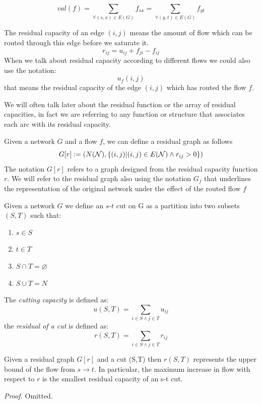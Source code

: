 \[val(f) = \sum_{\forall (s,x) \in E(G)} f_{sx} = \sum_{\forall (y,t) \in E(G)} f_{yt}\]
\begin{definition}
    The residual capacity of an edge $(i,j)$ means the amount of flow which can be routed through this edge before we saturate it.
    \[r_{ij} = u_{ij} + f_{ji} - f_{ij}\]    
    When we talk about residual capacity according to different flows we could also use the notation:    \[u_f(i,j)\]
    that means the residual capacity of the edge $(i,j)$ which has routed the flow $f$.

\end{definition}
We will often talk later about the residual function or the array of residual capacities, in fact we are referring to any function or structure that associates each arc with its residual capacity.

\begin{definition}
    Given a network $G$ and a flow $f$, we can define a residual graph as follows
    \[G[r] := (N(\mathcal{N}), \{(i,j) | (i,j)\in E(\mathcal{N}) \land r_{ij} > 0\})\]
    The notation $G[r]$ refers to a graph designed from the residual capacity function $r$. We will refer to the residual graph also using the notation $G_f$ that underlines the representation of the original network under the effect of the routed flow $f$
\end{definition}

\begin{definition}[s-t Cut]
    Given a network $G$ we define an $s$-$t$ cut on G as a partition into two subsets $(S, T)$ such that:
    \begin{enumerate}
        \item $s \in S$
        \item $t \in T$
        \item $S \cap T = \varnothing$
        \item $S \cup T = N$
    \end{enumerate}
    
    The \textit{cutting capacity} is defined as:
    \[u(S,T) = \sum_{i\in S\land j\in T} u_{ij}\]
    the \textit{residual of a cut} is defined as:
    \[r(S,T) = \sum_{i\in S\land j\in T} r_{ij}\]
\end{definition}

\begin{lemma}
    \label{maxFlowMinCut}
    Given a residual graph $G[r]$ and a cut (S,T) then $r(S,T)$ represents the upper bound of the flow from $s \rightarrow t$.
In particular, the maximum increase in flow with respect to $r$ is the smallest residual capacity of an s-t cut.
\end{lemma}
\textit{Proof. }Omitted.\\

